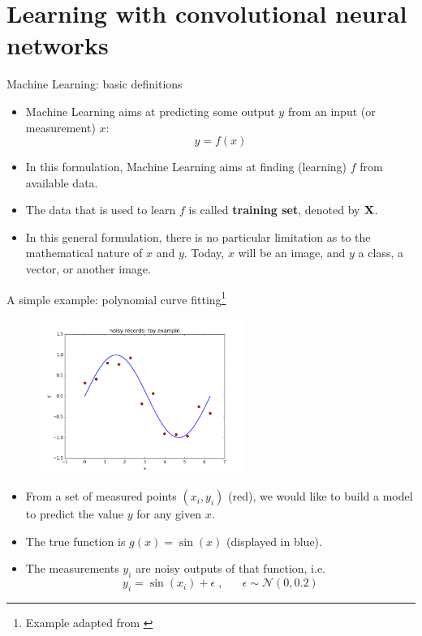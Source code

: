 \documentclass[xcolor=pdftex,dvipsnames,table,mathserif]{beamer}
\begin{document}
\section{Learning with convolutional neural networks}

\begin{frame}{Machine Learning: basic definitions}
\begin{itemize}
	\item Machine Learning aims at predicting some output $y$ from an input (or measurement) $x$:
	\begin{equation}
	y = f(x)
	\end{equation}
	\item In this formulation, Machine Learning aims at finding (learning) $f$ from available data.
	\item The data that is used to learn $f$ is called \textbf{training set}, denoted by $\mathbf{X}$.
	\item In this general formulation, there is no particular limitation as to the mathematical nature of $x$ and $y$. Today, $x$ will be an image, and $y$ a class, a vector, or another image.
\end{itemize}
\end{frame}

\begin{frame}{A simple example: polynomial curve fitting\footnote{Example adapted from \cite{Bishop2006}}}
\begin{figure}[htb]
\includegraphics[width=0.6\textwidth]{../graphics/sample_from_sin.png}
\end{figure}
\begin{itemize}
	\item From a set of measured points $(x_i, y_i)$ (red), we would like to build a model to predict the value $y$ for any given $x$.
	\item The true function is $g(x)=\sin (x)$ (displayed in blue).
	\item The measurements $y_i$ are noisy outputs of that function, i.e.
	\begin{equation}
	y_i = \sin (x_i) + \epsilon \; , \;\;\; \;\;\; \epsilon \sim \mathcal{N}(0,0.2)
	\end{equation}
\end{itemize}
\end{frame}
\end{document}
